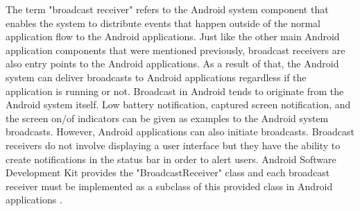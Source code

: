 The term "broadcast receiver" refers to the Android system component that enables the system to distribute events that happen outside of the normal application flow to the Android applications. Just like the other main Android application components that were mentioned previously, broadcast receivers are also entry points to the Android applications. As a result of that, the Android system can deliver broadcasts to Android applications regardless if the application is running or not. Broadcast in Android tends to originate from the Android system itself. Low battery notification, captured screen notification, and the screen on/of indicators can be given as examples to the Android system broadcasts. However, Android applications can also initiate broadcasts. Broadcast receivers do not involve displaying a user interface but they have the ability to create notifications in the status bar in order to alert users. Android Software Development Kit provides the "BroadcastReceiver" class and each broadcast receiver must be implemented as a subclass of this provided class in Android applications \cite{9}.